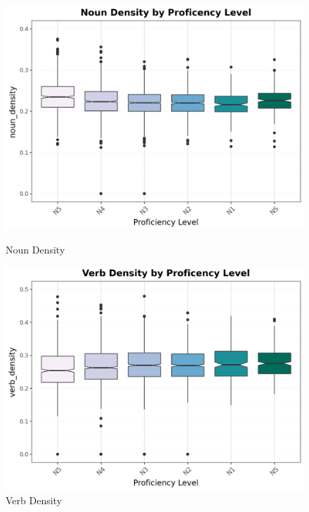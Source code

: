 \begin{figure}[htbp]
    \centering
    \begin{minipage}{.48\textwidth}
        \centering
    \includegraphics[scale=.4]{img/NounDen}
    \caption[Noun Density Across JLPT Proficiency Levels]{Noun Density}
        \label{fig:nounDen}
    \end{minipage}
    \hfill
\begin{minipage}{.48\textwidth}
        \centering
        \includegraphics[scale=.4]{img/VerbDen}
        \caption[Verb Density Across JLPT Proficiency Levels]{Verb Density}
\label{fig:verbDen}
\end{minipage}
    \end{figure}


